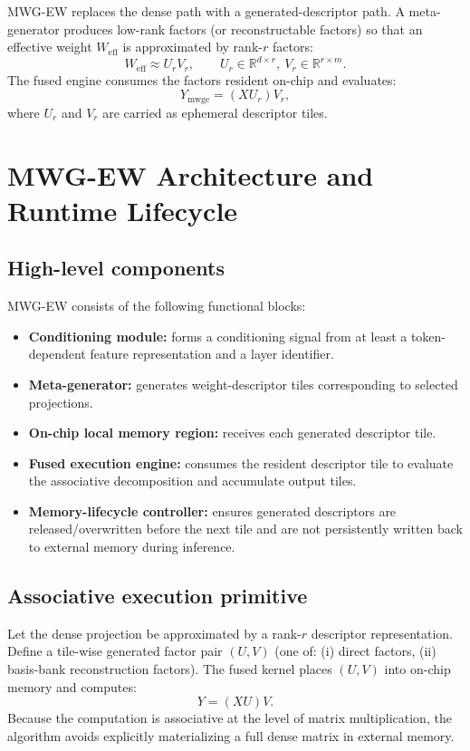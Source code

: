 \documentclass[11pt]{article}
\begin{document}
MWG-EW replaces the dense path with a generated-descriptor path. A meta-generator produces low-rank factors (or reconstructable factors) so that an effective weight $W_{\text{eff}}$ is approximated by rank-$r$ factors:
\begin{equation}
W_{\text{eff}} \approx U_r V_r,\qquad U_r\in\mathbb{R}^{d\times r},\ V_r\in\mathbb{R}^{r\times m}.
\end{equation}
The fused engine consumes the factors resident on-chip and evaluates:
\begin{equation}
Y_{\text{mwge}} = (XU_r)V_r,
\end{equation}
where $U_r$ and $V_r$ are carried as ephemeral descriptor tiles.

\section{MWG-EW Architecture and Runtime Lifecycle}
\subsection{High-level components}
MWG-EW consists of the following functional blocks:
\begin{itemize}[leftmargin=1.2em]
  \item \textbf{Conditioning module:} forms a conditioning signal from at least a token-dependent feature representation and a layer identifier.
  \item \textbf{Meta-generator:} generates weight-descriptor tiles corresponding to selected projections.
  \item \textbf{On-chip local memory region:} receives each generated descriptor tile.
  \item \textbf{Fused execution engine:} consumes the resident descriptor tile to evaluate the associative decomposition and accumulate output tiles.
  \item \textbf{Memory-lifecycle controller:} ensures generated descriptors are released/overwritten before the next tile and are not persistently written back to external memory during inference.
\end{itemize}

\subsection{Associative execution primitive}
Let the dense projection be approximated by a rank-$r$ descriptor representation.
Define a tile-wise generated factor pair $(U, V)$ (one of: 
(i) direct factors, (ii) basis-bank reconstruction factors). The fused kernel places $(U,V)$ into on-chip memory and computes:
\begin{equation}
Y = (XU)V.
\end{equation}
Because the computation is associative at the level of matrix multiplication, the algorithm avoids explicitly materializing a full dense matrix in external memory.
\end{document}
